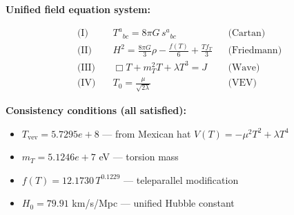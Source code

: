 
\textbf{Unified field equation system:}

\begin{align}
  \text{(I)} \quad & T^a{}_{bc} = 8\pi G \, s^a{}_{bc} && \text{(Cartan)} \\
  \text{(II)} \quad & H^2 = \frac{8\pi G}{3}\rho - \frac{f(T)}{6} + \frac{Tf_T}{3} && \text{(Friedmann)} \\
  \text{(III)} \quad & \Box T + m_T^2 T + \lambda T^3 = J && \text{(Wave)} \\
  \text{(IV)} \quad & T_0 = \frac{\mu}{\sqrt{2\lambda}} && \text{(VEV)}
\end{align}

\textbf{Consistency conditions (all satisfied):}
\begin{itemize}
  \item $T_{\text{vev}} = 5.7295e+8$ — from Mexican hat $V(T) = -\mu^2 T^2 + \lambda T^4$
  \item $m_T = 5.1246e+7$ eV — torsion mass
  \item $f(T) = 12.1730 \, T^{0.1229}$ — teleparallel modification
  \item $H_0 = 79.91$ km/s/Mpc — unified Hubble constant
\end{itemize}